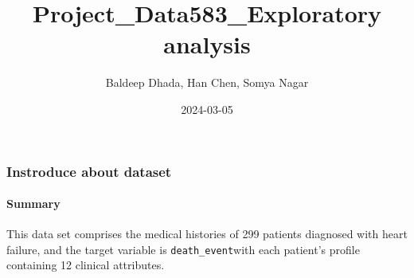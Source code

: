 \documentclass[
]{article}
\title{Project\_Data583\_Exploratory analysis}
\author{Baldeep Dhada, Han Chen, Somya Nagar}
\date{2024-03-05}
\begin{document}
\maketitle

\subsubsection{Instroduce about dataset}\label{instroduce-about-dataset}

\paragraph{Summary}\label{summary}

This data set comprises the medical histories of 299 patients diagnosed
with heart failure, and the target variable is \texttt{death\_event}with
each patient's profile containing 12 clinical attributes.
\end{document}
